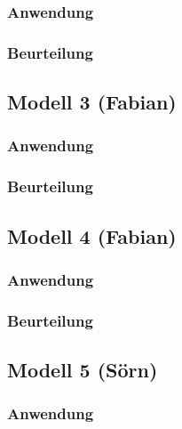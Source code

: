 \documentclass[
  letterpaper,
  DIV=11]{scrartcl}
\begin{document}
\hypertarget{anwendung-1}{%
\subsubsection{Anwendung}\label{anwendung-1}}

\hypertarget{beurteilung-1}{%
\subsubsection{Beurteilung}\label{beurteilung-1}}

\hypertarget{modell-3-fabian}{%
\subsection{Modell 3 (Fabian)}\label{modell-3-fabian}}

\hypertarget{anwendung-2}{%
\subsubsection{Anwendung}\label{anwendung-2}}

\hypertarget{beurteilung-2}{%
\subsubsection{Beurteilung}\label{beurteilung-2}}

\hypertarget{modell-4-fabian}{%
\subsection{Modell 4 (Fabian)}\label{modell-4-fabian}}

\hypertarget{anwendung-3}{%
\subsubsection{Anwendung}\label{anwendung-3}}

\hypertarget{beurteilung-3}{%
\subsubsection{Beurteilung}\label{beurteilung-3}}

\hypertarget{modell-5-suxf6rn}{%
\subsection{Modell 5 (Sörn)}\label{modell-5-suxf6rn}}

\hypertarget{anwendung-4}{%
\subsubsection{Anwendung}\label{anwendung-4}}
\end{document}
